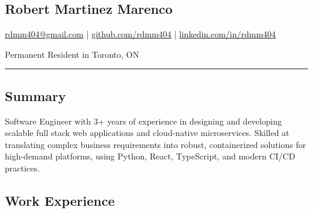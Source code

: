 \documentclass[a4paper,10pt]{article}
\begin{document}
\pagestyle{empty}

\begin{center}
  \section*{\LARGE Robert Martinez Marenco}
  \href{mailto:rdmm404@gmail.com}{rdmm404@gmail.com} |
  \href{https://github.com/rdmm404}{github.com/rdmm404} |
  \href{https://linkedin.com/in/rdmm404}{linkedin.com/in/rdmm404}

  Permanent Resident in Toronto, ON
\end{center}

\hrule
\vspace{4pt}

\subsection*{Summary}
Software Engineer with 3+ years of experience in designing and developing scalable full stack web applications
and cloud-native microservices. Skilled at translating complex business requirements into robust, containerized solutions
for high-demand platforms, using Python, React, TypeScript, and modern CI/CD practices.

\subsection*{Work Experience}
\end{document}
